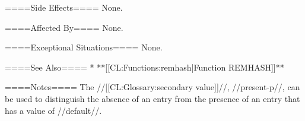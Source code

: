 ====Side Effects====
None.

====Affected By====
None.

====Exceptional Situations====
None.

====See Also====
  * **[[CL:Functions:remhash|Function REMHASH]]**

====Notes====
The //[[CL:Glossary:secondary value]]//, //present-p//, can be used to distinguish the absence of an entry from the presence of an entry that has a value of //default//.


